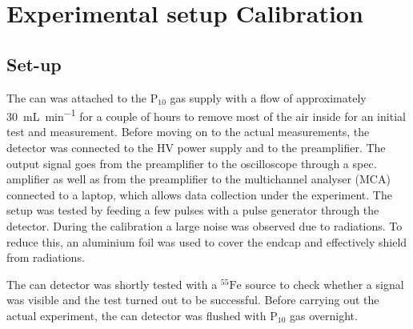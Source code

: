 \section{Experimental setup Calibration}

\subsection{Set-up}

The can was attached to the $\mathrm{P}_{10}$ gas supply with a flow of
approximately \SI{30}{\milli\liter\per\minute} for a couple of hours to remove
most of the air inside for an initial test and measurement. Before moving on to
the actual measurements, the detector was connected to the HV power supply and
to the preamplifier. The output signal goes from the preamplifier to the
oscilloscope through a spec. amplifier as well as from the preamplifier to the
multichannel analyser (MCA) connected to a laptop, which allows data collection
under the experiment. The setup was tested by feeding a few pulses with a pulse
generator through the detector. During the calibration a large noise was
observed due to radiations. To reduce this, an aluminium foil was used to cover
the endcap and effectively shield from radiations.

The can detector was shortly tested with a $^{55}\mathrm{Fe}$ source to check
whether a signal was visible and the test turned out to be successful. Before
carrying out the actual experiment, the can detector was flushed with
$\mathrm{P}_{10}$ gas overnight.



